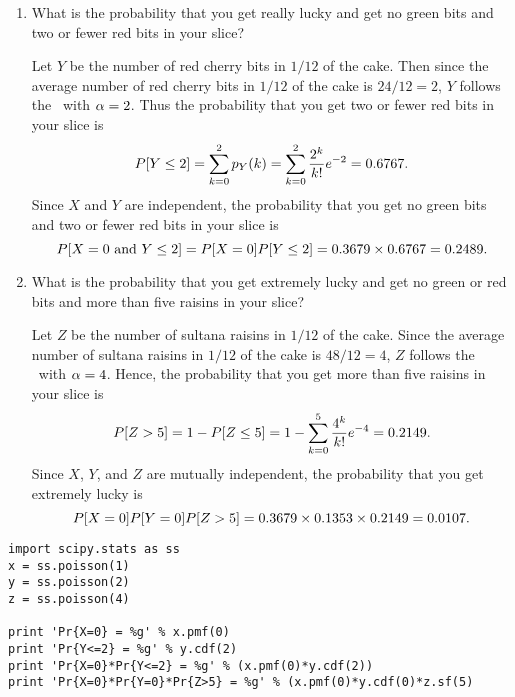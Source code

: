 \begin{enumerate}
\begin{enumerate}
		\item What is the probability that you get really lucky and get no green bits
		and two or fewer red bits in your slice?
		\ifdefined\sol
		\begin{solution}
			Let $Y$ be the number of red cherry bits in $1/12$ of the cake.
			Then since the average number of red cherry bits in $1/12$ of the cake is $24/12=2$,
			$Y$ follows the \possdist\ with $\alpha=2$.
			Thus the probability that you get two or fewer red bits in your slice is
			\[
				P[Y\leq2]
				= \sum_{k=0}^{2} p_{Y}(k)
				= \sum_{k=0}^{2} \frac{2^k}{k!} e^{-2}
				= 0.6767.
			\]
			Since $X$ and $Y$ are independent,
			the probability that you get no green bits
			and two or fewer red bits in your slice
			is
			\[
				P[X=0\mbox{ and } Y\leq2]
				= P[X=0] P[Y\leq2]
				= 0.3679 \times 0.6767
				= 0.2489.
			\]
		\end{solution}
		\fi

		\item What is the probability that you get extremely lucky and get no green
		or red bits and more than five raisins in your slice?
		\ifdefined\sol
		\begin{solution}
			Let $Z$ be the number of sultana raisins in $1/12$ of the cake.
			Since the average number of sultana raisins in $1/12$
			of the cake is $48/12=4$,
			$Z$ follows the \possdist\ with $\alpha=4$.
			Hence,
			the probability that you get more than five raisins in your slice
			is
			\[
				P[Z>5] = 1 - P[Z\leq 5]
				= 1- \sum_{k=0}^{5} \frac{4^k}{k!} e^{-4}
				= 0.2149.
			\]
			Since $X$, $Y$, and $Z$ are mutually independent,
			the probability that you get extremely lucky
			is
			\[
				P[X=0] P[Y=0] P[Z>5]
				= 0.3679 \times 0.1353 \times 0.2149
				= 0.0107.
			\]
		\end{solution}
		\fi

	\end{enumerate}
\ifdefined\sol
\begin{pcode}
\begin{verbatim}
import scipy.stats as ss
x = ss.poisson(1)
y = ss.poisson(2)
z = ss.poisson(4)

print 'Pr{X=0} = %g' % x.pmf(0)
print 'Pr{Y<=2} = %g' % y.cdf(2)
print 'Pr{X=0}*Pr{Y<=2} = %g' % (x.pmf(0)*y.cdf(2))
print 'Pr{X=0}*Pr{Y=0}*Pr{Z>5} = %g' % (x.pmf(0)*y.cdf(0)*z.sf(5)
\end{verbatim}
\end{pcode}
\fi


\end{enumerate}
